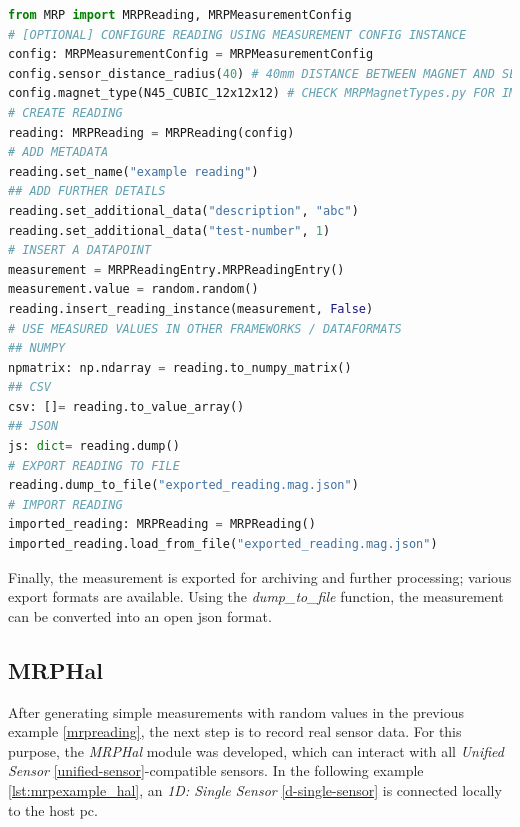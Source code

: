 \begin{lstlisting}[language=Python, caption={MRPReading example for setting up an basic measurement}, label=lst:mrpexample_reading]
from MRP import MRPReading, MRPMeasurementConfig
# [OPTIONAL] CONFIGURE READING USING MEASUREMENT CONFIG INSTANCE
config: MRPMeasurementConfig = MRPMeasurementConfig
config.sensor_distance_radius(40) # 40mm DISTANCE BETWEEN MAGNET AND SENSOR
config.magnet_type(N45_CUBIC_12x12x12) # CHECK MRPMagnetTypes.py FOR IMPLEMENTED TYPES
# CREATE READING
reading: MRPReading = MRPReading(config)
# ADD METADATA
reading.set_name("example reading")
## ADD FURTHER DETAILS
reading.set_additional_data("description", "abc")
reading.set_additional_data("test-number", 1)
# INSERT A DATAPOINT
measurement = MRPReadingEntry.MRPReadingEntry()
measurement.value = random.random()
reading.insert_reading_instance(measurement, False)
# USE MEASURED VALUES IN OTHER FRAMEWORKS / DATAFORMATS
## NUMPY
npmatrix: np.ndarray = reading.to_numpy_matrix()
## CSV
csv: []= reading.to_value_array()
## JSON
js: dict= reading.dump()
# EXPORT READING TO FILE
reading.dump_to_file("exported_reading.mag.json")
# IMPORT READING
imported_reading: MRPReading = MRPReading()
imported_reading.load_from_file("exported_reading.mag.json")
\end{lstlisting}

Finally, the measurement is exported for archiving and further
processing; various export formats are available. Using the
\emph{dump\_to\_file} function, the measurement can be converted into an
open \gls{json} format.

\hypertarget{mrphal}{%
\subsection{MRPHal}\label{mrphal}}

After generating simple measurements with random values in the previous
example \ref{mrpreading}, the next step is to record real sensor data.
For this purpose, the \emph{MRPHal} module was developed, which can
interact with all \emph{Unified Sensor} \ref{unified-sensor}-compatible
sensors. In the following example \ref{lst:mrpexample_hal}, an \emph{1D:
Single Sensor} \ref{d-single-sensor} is connected locally to the host
\gls{pc}.

